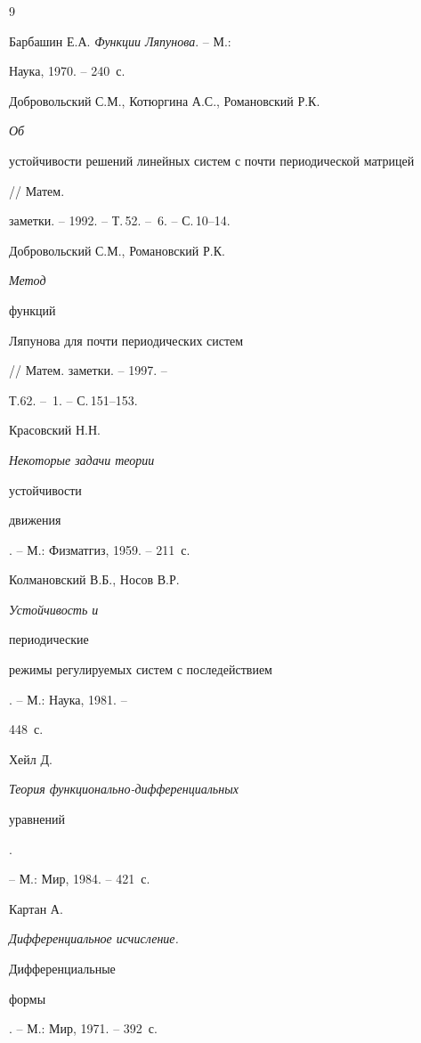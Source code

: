 \begin{thebibliography}{9}







Барбашин Е.А. {\it Функции Ляпунова}. -- М.:


Наука, 1970. -- 240~с.




Добровольский С.М., Котюргина А.С., Романовский Р.К. {\it Об


устойчивости решений линейных систем с почти периодической матрицей}


// Матем.


заметки. -- 1992. -- Т.\,52. -- \No\,6. -- С.\,10--14.




Добровольский С.М., Романовский Р.К. {\it Метод


функций


Ляпунова для почти периодических систем} // Матем. заметки. -- 1997. --


Т.62. -- \No\,1. -- С.\,151--153.




Красовский Н.Н. {\it Некоторые задачи теории


устойчивости


движения}. -- М.: Физматгиз, 1959. -- 211~с.




Колмановский В.Б., Носов В.Р. {\it Устойчивость и


периодические


режимы регулируемых систем с последействием}. -- М.: Наука, 1981. --


448~с.




Хейл Д. {\it Теория функционально-дифференциальных


уравнений}.


-- М.: Мир, 1984. -- 421~с.




Картан А. {\it Дифференциальное исчисление.


Дифференциальные


формы}. -- М.: Мир, 1971. -- 392~с.





\end{thebibliography}





\vskip 2cm












\label{end}








